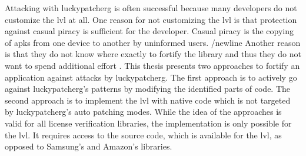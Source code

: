 Attacking with \gls{luckypatcherg} is often successful because many developers do not customize the \gls{lvl} at all.
One reason for not customizing the \gls{lvl} is that protection against casual piracy is sufficient for the developer.
Casual piracy is the copying of \gls{apk}s from one device to another by uninformed users.
/newline
Another reason is that they do not know where exactly to fortify the library and thus they do not want to spend additional effort \cite{developersSecuring}.
\newline
\newline
This thesis presents two approaches to fortify an application against attacks by \gls{luckypatcherg}.
\newline
The first approach is to actively go against \gls{luckypatcherg}'s patterns by modifying the identified parts of code.
\newline
The second approach is to implement the \gls{lvl} with native code which is not targeted by \gls{luckypatcherg}'s auto patching modes.
\newline
While the idea of the approaches is valid for all license verification libraries, the implementation is only possible for the \gls{lvl}.
It requires access to the source code, which is available for the \gls{lvl}, as opposed to Samsung’s and Amazon’s libraries.
